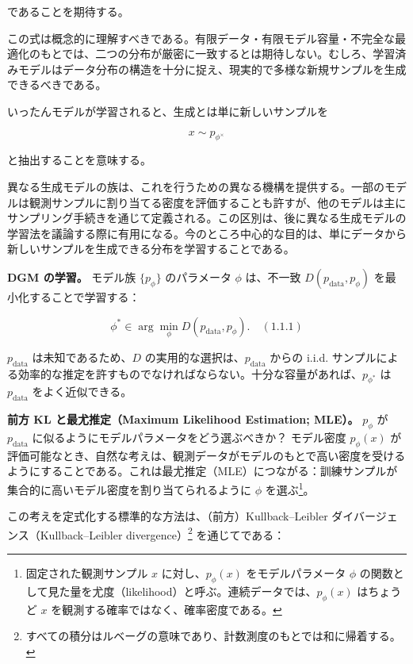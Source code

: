 であることを期待する。

この式は概念的に理解すべきである。有限データ・有限モデル容量・不完全な最適化のもとでは、二つの分布が厳密に一致するとは期待しない。むしろ、学習済みモデルはデータ分布の構造を十分に捉え、現実的で多様な新規サンプルを生成できるべきである。

いったんモデルが学習されると、生成とは単に新しいサンプルを

\[
x \sim p_{\phi^\times}
\]


と抽出することを意味する。




異なる生成モデルの族は、これを行うための異なる機構を提供する。一部のモデルは観測サンプルに割り当てる密度を評価することも許すが、他のモデルは主にサンプリング手続きを通じて定義される。この区別は、後に異なる生成モデルの学習法を議論する際に有用になる。今のところ中心的な目的は、単にデータから新しいサンプルを生成できる分布を学習することである。

\textbf{DGM の学習。} モデル族 $\{p_\phi\}$ のパラメータ $\phi$ は、不一致 $D(p_{\mathrm{data}}, p_\phi)$ を最小化することで学習する：

\[
\phi^* \in \arg\min_\phi D(p_{\mathrm{data}}, p_\phi). \quad (1.1.1)
\]


$p_{\mathrm{data}}$ は未知であるため、$D$ の実用的な選択は、$p_{\mathrm{data}}$ からの i.i.d. サンプルによる効率的な推定を許すものでなければならない。十分な容量があれば、$p_{\phi^*}$ は $p_{\mathrm{data}}$ をよく近似できる。

\textbf{前方 KL と最尤推定（Maximum Likelihood Estimation; MLE）。} $p_\phi$ が $p_{\mathrm{data}}$ に似るようにモデルパラメータをどう選ぶべきか？ モデル密度 $p_\phi(x)$ が評価可能なとき、自然な考えは、観測データがモデルのもとで高い密度を受けるようにすることである。これは最尤推定（MLE）につながる：訓練サンプルが集合的に高いモデル密度を割り当てられるように $\phi$ を選ぶ\footnote{固定された観測サンプル $x$ に対し、$p_\phi(x)$ をモデルパラメータ $\phi$ の関数として見た量を尤度（likelihood）と呼ぶ。連続データでは、$p_\phi(x)$ はちょうど $x$ を観測する確率ではなく、確率密度である。}。


この考えを定式化する標準的な方法は、（前方）Kullback–Leibler ダイバージェンス（Kullback–Leibler divergence）\footnote{すべての積分はルベーグの意味であり、計数測度のもとでは和に帰着する。} を通じてである：

